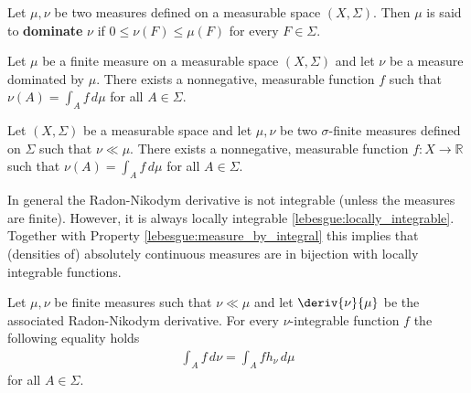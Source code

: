     \begin{definition}
        Let $\mu,\nu$ be two measures defined on a measurable space $(X,\Sigma)$. Then $\mu$ is said to \textbf{dominate} $\nu$ if $0\leq\nu(F)\leq\mu(F)$ for every $F\in\Sigma$.
    \end{definition}

    \begin{theorem}
        Let $\mu$ be a finite measure on a measurable space $(X,\Sigma)$ and let $\nu$ be a measure dominated by $\mu$. There exists a nonnegative, measurable function $f$ such that $\nu(A) = \int_Af\,d\mu$ for all $A\in\Sigma$.
    \end{theorem}

    \begin{theorem}\label{lebesgue:radon_nikodym}
        Let $(X,\Sigma)$ be a measurable space and let $\mu,\nu$ be two $\sigma$-finite measures defined on $\Sigma$ such that $\nu\ll\mu$. There exists a nonnegative, measurable function $f:X\rightarrow\mathbb{R}$ such that $\nu(A) = \int_Af\,d\mu$ for all $A\in\Sigma$.
    \end{theorem}
    \begin{property}
        In general the Radon-Nikodym derivative is not integrable (unless the measures are finite). However, it is always locally integrable \ref{lebesgue:locally_integrable}. Together with Property \ref{lebesgue:measure_by_integral} this implies that (densities of) absolutely continuous measures are in bijection with locally integrable functions.
    \end{property}

    \begin{property}
        Let $\mu,\nu$ be finite measures such that $\nu\ll\mu$ and let $\deriv{\nu}{\mu}$ be the associated Radon-Nikodym derivative. For every $\nu$-integrable function $f$ the following equality holds
        \begin{gather}
            \int_A f\,d\nu = \int_Afh_\nu\,d\mu
        \end{gather}
        for all $A\in\Sigma$.
    \end{property}

